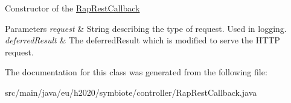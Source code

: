 Constructor of the \hyperlink{classeu_1_1h2020_1_1symbiote_1_1controller_1_1RapRestCallback}{Rap\+Rest\+Callback}


\begin{DoxyParams}{Parameters}
{\em request} & String describing the type of request. Used in logging. \\
\hline
{\em deferred\+Result} & The deferred\+Result which is modified to serve the H\+T\+TP request. \\
\hline
\end{DoxyParams}


The documentation for this class was generated from the following file\+:\begin{DoxyCompactItemize}
\item 
src/main/java/eu/h2020/symbiote/controller/Rap\+Rest\+Callback.\+java\end{DoxyCompactItemize}
